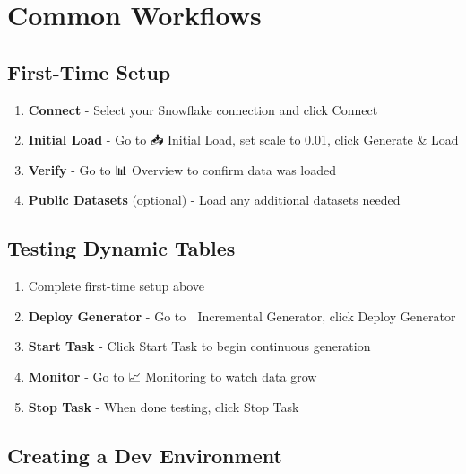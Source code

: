 \documentclass[
  letterpaper,
  DIV=11,
  numbers=noendperiod]{scrreprt}
\providecommand{\tightlist}{%
  \setlength{\itemsep}{0pt}\setlength{\parskip}{0pt}}\usepackage{longtable,booktabs,array}
\begin{document}
\hypertarget{common-workflows}{%
\section{Common Workflows}\label{common-workflows}}

\hypertarget{first-time-setup}{%
\subsection{First-Time Setup}\label{first-time-setup}}

\begin{enumerate}
\def\labelenumi{\arabic{enumi}.}
\tightlist
\item
  \textbf{Connect} - Select your Snowflake connection and click Connect
\item
  \textbf{Initial Load} - Go to 📥 Initial Load, set scale to 0.01,
  click Generate \& Load
\item
  \textbf{Verify} - Go to 📊 Overview to confirm data was loaded
\item
  \textbf{Public Datasets} (optional) - Load any additional datasets
  needed
\end{enumerate}

\hypertarget{testing-dynamic-tables}{%
\subsection{Testing Dynamic Tables}\label{testing-dynamic-tables}}

\begin{enumerate}
\def\labelenumi{\arabic{enumi}.}
\tightlist
\item
  Complete first-time setup above
\item
  \textbf{Deploy Generator} - Go to 🔄 Incremental Generator, click
  Deploy Generator
\item
  \textbf{Start Task} - Click Start Task to begin continuous generation
\item
  \textbf{Monitor} - Go to 📈 Monitoring to watch data grow
\item
  \textbf{Stop Task} - When done testing, click Stop Task
\end{enumerate}

\hypertarget{creating-a-dev-environment}{%
\subsection{Creating a Dev
Environment}\label{creating-a-dev-environment}}
\end{document}
